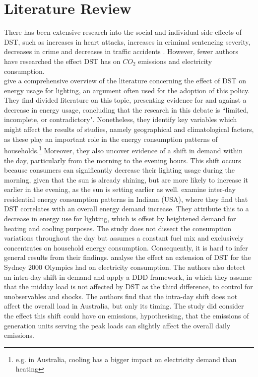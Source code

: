 \section{Literature Review}
There has been extensive research into the social and individual side effects of \ac{DST}, such as increases in heart attacks, increases in criminal sentencing severity, decreases in crime and decreases in traffic accidents \parencite{heart_attacks, sleepy_punishers, doleac_crime, bunnings_traffic}.
However, fewer authors have researched the effect \ac{DST} has on $CO_2$ emissions and electricity consumption. \\
\textcite{aries_effect_2008} give a comprehensive overview of the literature concerning the effect of \ac{DST} on energy usage for lighting, an argument often used for the adoption of this policy. They find divided literature on this topic, presenting evidence for and against a decrease in energy usage, concluding that the research in this debate is ``limited, incomplete, or contradictory". Nonetheless, they identify key variables which might affect the results of studies, namely geographical and climatological factors, as these play an important role in the energy consumption patterns of households.\footnote{e.g. in Australia, cooling has a bigger impact on electricity demand than heating} Moreover, they also uncover evidence of a shift in demand within the day, particularly from the morning to the evening hours. This shift occurs because consumers can significantly decrease their lighting usage during the morning, given that the sun is already shining, but are more likely to increase it earlier in the evening, as the sun is setting earlier as well.
\textcite{kotchen} examine inter-day residential energy consumption patterns in Indiana (USA), where they find that \ac{DST} correlates with an overall energy demand increase. They attribute this to a decrease in energy use for lighting, which is offset by heightened demand for heating and cooling purposes. The study does not dissect the consumption variations throughout the day but assumes a constant fuel mix and exclusively concentrates on household energy consumption. Consequently, it is hard to infer general results from their findings.
\textcite{kellogg_daylight_2008} analyse the effect  an extension of \ac{DST} for the Sydney 2000 Olympics had on electricity consumption. The authors also detect an intra-day shift in demand and apply a \ac{DDD} framework, in which they assume that the midday load is not affected by \ac{DST} as the third difference, to control for unobservables and shocks. The authors find that the intra-day shift does not affect the overall load in Australia, but only its timing. The study did consider the effect this shift could have on emissions, hypothesising, that the emissions of generation units serving the peak loads can slightly affect the overall daily emissions.
